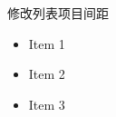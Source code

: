 \documentclass{ctexbeamer}
\begin{document}
\begin{frame}{修改列表项目间距}

\begin{itemize}
  \item Item 1
  \vspace{0.5cm}
  \item Item 2
  \vspace{1cm}
  \item Item 3
\end{itemize}

\end{frame}
\end{document}

